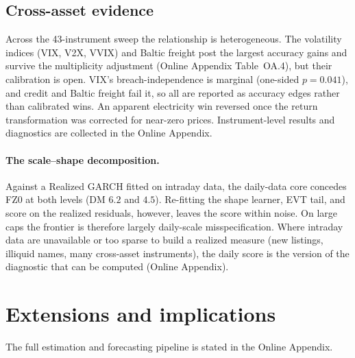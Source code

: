 \documentclass[11pt]{article}
\theoremstyle{remark}
\begin{document}
\subsection{Cross-asset evidence}

Across the 43-instrument sweep the relationship is heterogeneous. The volatility indices (VIX, V2X, VVIX) and Baltic freight post the largest accuracy gains and survive the multiplicity adjustment (Online Appendix Table~OA.4), but their calibration is open. VIX's breach-independence is marginal (one-sided $p=0.041$), and credit and Baltic freight fail it, so all are reported as accuracy edges rather than calibrated wins. An apparent electricity win reversed once the return transformation was corrected for near-zero prices. Instrument-level results and diagnostics are
collected in the Online Appendix.

\paragraph{The scale--shape decomposition.} Against a Realized GARCH \citep{hansen2012realized} fitted on intraday data, the daily-data core concedes FZ0 at both levels (DM $6.2$ and $4.5$). Re-fitting the shape learner, EVT tail, and score on the realized residuals, however, leaves the score within noise. On large caps the frontier is therefore largely daily-scale misspecification. Where intraday data are unavailable or too sparse to build a realized measure (new listings, illiquid names, many cross-asset instruments), the daily score is the version of the diagnostic that can be computed (Online Appendix).

\section{Extensions and implications}\label{sec:applications}

\noindent The full estimation and forecasting pipeline is stated in the Online Appendix.
\end{document}
